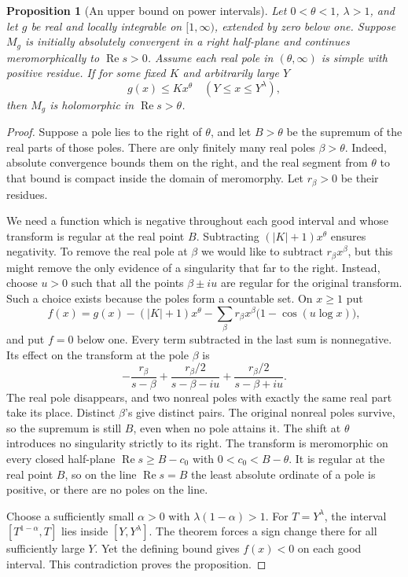 \documentclass[11pt,letterpaper]{article}
\newcommand{\Rea}{\operatorname{Re}}
\newtheorem{proposition}[theorem]{Proposition}
\numberwithin{equation}{section}
\begin{document}
\begin{proposition}[An upper bound on power intervals]\label{prop:window}
Let \(0<\theta<1\), \(\lambda>1\), and let \(g\) be real and locally integrable on \([1,\infty)\), extended by zero below one. Suppose \(M_g\) is initially absolutely convergent in a right half-plane and continues meromorphically to \(\Rea s>0\). Assume each real pole in \((\theta,\infty)\) is simple with positive residue. If for some fixed \(K\) and arbitrarily large \(Y\)
\[
                         g(x)\le Kx^\theta\quad(Y\le x\le Y^\lambda),
\]
then \(M_g\) is holomorphic in \(\Rea s>\theta\).
\end{proposition}
\begin{proof}
Suppose a pole lies to the right of \(\theta\), and let \(B>\theta\) be the supremum of the real parts of those poles. There are only finitely many real poles \(\beta>\theta\). Indeed, absolute convergence bounds them on the right, and the real segment from \(\theta\) to that bound is compact inside the domain of meromorphy. Let \(r_\beta>0\) be their residues.

We need a function which is negative throughout each good interval and whose transform is regular at the real point \(B\). Subtracting \((|K|+1)x^\theta\) ensures negativity. To remove the real pole at \(\beta\) we would like to subtract \(r_\beta x^\beta\), but this might remove the only evidence of a singularity that far to the right. Instead, choose \(u>0\) such that all the points \(\beta\pm iu\) are regular for the original transform. Such a choice exists because the poles form a countable set. On \(x\ge1\) put
\[
 f(x)=g(x)-(|K|+1)x^\theta
              -\sum_\beta r_\beta x^\beta\bigl(1-\cos(u\log x)\bigr),
\]
and put \(f=0\) below one. Every term subtracted in the last sum is nonnegative. Its effect on the transform at the pole \(\beta\) is
\[
 -\frac{r_\beta}{s-\beta}
       +\frac{r_\beta/2}{s-\beta-iu}
       +\frac{r_\beta/2}{s-\beta+iu}.
\]
The real pole disappears, and two nonreal poles with exactly the same real part take its place. Distinct \(\beta\)'s give distinct pairs. The original nonreal poles survive, so the supremum is still \(B\), even when no pole attains it. The shift at \(\theta\) introduces no singularity strictly to its right. The transform is meromorphic on every closed half-plane \(\Rea s\ge B-c_0\) with \(0<c_0<B-\theta\). It is regular at the real point \(B\), so on the line \(\Rea s=B\) the least absolute ordinate of a pole is positive, or there are no poles on the line.

Choose a sufficiently small \(\alpha>0\) with \(\lambda(1-\alpha)>1\). For \(T=Y^\lambda\), the interval \([T^{1-\alpha},T]\) lies inside \([Y,Y^\lambda]\). The theorem forces a sign change there for all sufficiently large \(Y\). Yet the defining bound gives \(f(x)<0\) on each good interval. This contradiction proves the proposition.
\end{proof}
\end{document}
